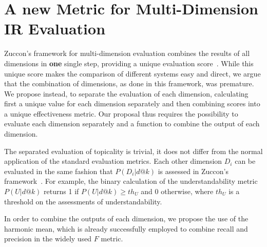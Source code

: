 
\section{A new Metric for Multi-Dimension IR Evaluation}
\label{sec:extension}

Zuccon's framework for multi-dimension evaluation combines the results of all dimensions in \textbf{one} single step, providing a unique evaluation score~\cite{zuccon14,zuccon16}.
While this unique score makes the comparison of different systems easy and direct, we argue that the combination of dimensions, as done in this framework, was premature.
We propose instead, to separate the evaluation of each dimension, calculating first a unique value for each dimension separately and then combining scores into a unique effectiveness metric.
Our proposal thus requires the possibility to evaluate each dimension separately and a function to combine the output of each dimension.

The separated evaluation of topicality is trivial, it does not differ from the normal application of the standard evaluation metrics. 
Each other dimension $D_i$ can be evaluated in the same fashion that $P(D_i|d@k)$ is assessed in Zuccon's framework~\cite{zuccon16}.
For example, the binary calculation of the understandability metric $P(U|d@k)$ returns 1 if $P(U|d@k) \geq th_U$ and 0 otherwise, where $th_U$ is a threshold on the assessments of understandability. 

In order to combine the outputs of each dimension, we propose the use of the harmonic mean, which is already successfully employed to combine recall and precision in the widely used $F$ metric.

